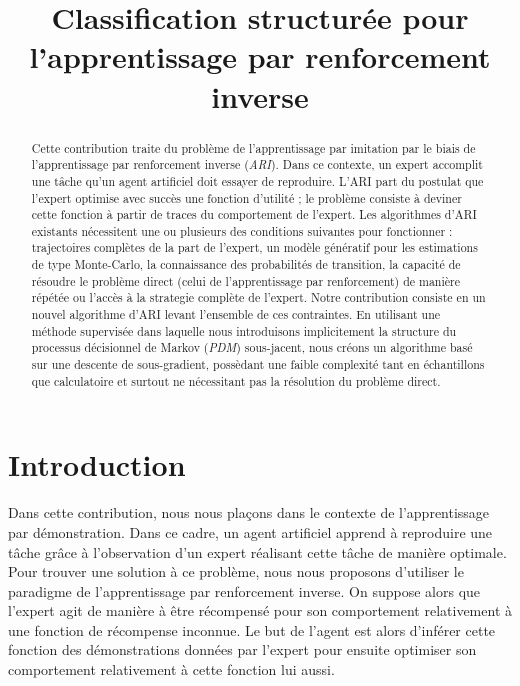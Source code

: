\documentclass[publibook-draft]{CAp2012}
\title{Classification structurée pour l'apprentissage par renforcement inverse}
\author{\fontsize{12}{12}\selectfont{Edouard Klein\inst{1}$^,$\inst{2}, Bilal Piot \inst{1}$^,$\inst{3}, Matthieu Geist\inst{1}, Olivier Pietquin\inst{1}$^,$\inst{3}}}
\institute{
Sup\'elec, IMS Research group, France, \texttt{prenom.nom@supelec.fr}
\and
Equipe ABC,
LORIA, France
\and
UMI 2958
GeorgiaTech-CNRS, France
}
\begin{document}
\maketitle


\begin{abstract}
  Cette contribution traite du problème de l'apprentissage par imitation par le biais de l'apprentissage par renforcement inverse (\emph{ARI}). Dans ce contexte, un expert accomplit une tâche qu'un agent artificiel doit essayer de reproduire. L'ARI part du postulat que l'expert optimise avec succès une fonction d'utilité ; le problème consiste à deviner cette fonction à partir de  traces du comportement de l'expert. Les algorithmes d'ARI existants nécessitent une ou plusieurs des conditions suivantes pour fonctionner : trajectoires complètes de la part de l'expert, un modèle génératif pour les estimations de type Monte-Carlo, la connaissance des probabilités de transition, la capacité de résoudre le problème direct (celui de l'apprentissage par renforcement) de manière répétée ou l'accès à la strategie complète de l'expert. Notre contribution consiste en un nouvel algorithme d'ARI levant l'ensemble de ces contraintes. En utilisant une méthode supervisée dans laquelle nous introduisons implicitement la structure du processus décisionnel de Markov ({\it PDM}) sous-jacent, nous créons un algorithme basé sur une descente de sous-gradient, possèdant une faible complexité tant en échantillons que calculatoire et surtout ne nécessitant pas la résolution du problème direct.
\end{abstract}
\section{Introduction}
Dans cette contribution, nous nous plaçons dans le contexte de l'apprentissage par démonstration. Dans ce cadre, un agent artificiel apprend à reproduire une tâche grâce à l'observation d'un expert réalisant cette tâche de manière optimale. Pour trouver une solution à ce problème, nous nous proposons d'utiliser le paradigme de l'apprentissage par renforcement inverse. On suppose alors que l'expert agit de manière à être récompensé pour son comportement relativement à une fonction de récompense inconnue. Le but de l'agent est alors d'inférer cette fonction des démonstrations données par l'expert pour ensuite optimiser son comportement relativement à cette fonction lui aussi.\\
\end{document}
